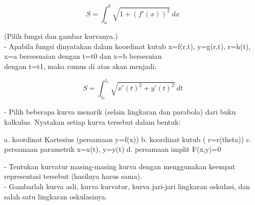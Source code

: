 \documentclass{article}
\begin{document}
\begin{eulernotebook}
\begin{eulercomment}
\begin{eulercomment}
\begin{eulercomment}
\begin{eulercomment}
\begin{eulercomment}
\begin{eulercomment}
\begin{eulercomment}
\begin{eulercomment}
\begin{eulercomment}
\begin{eulercomment}
\begin{eulercomment}
\begin{eulercomment}
\begin{eulercomment}
\begin{eulercomment}
\begin{eulercomment}
\begin{eulercomment}
\begin{eulercomment}
\begin{eulercomment}
\begin{eulercomment}
\begin{eulercomment}
\begin{eulercomment}
\begin{eulercomment}
\begin{eulercomment}
\begin{eulercomment}
\begin{eulercomment}
\end{eulercomment}
\begin{eulerformula}
\[
S = \int_a^b \sqrt{1+(f'(x))^2} \ dx
\]
\end{eulerformula}
\begin{eulercomment}
(Pilih fungsi dan gambar kurvanya.)\\
- Apabila fungsi dinyatakan dalam koordinat kutub x=f(r,t), y=g(r,t),
r=h(t), x=a bersesuaian dengan t=t0 dan x=b bersesuian\\
dengan t=t1, maka rumus di atas akan menjadi:

\end{eulercomment}
\begin{eulerformula}
\[
S=\int_{t_0}^{t_1} \sqrt{x'(t)^2+y'(t)^2}\ dt
\]
\end{eulerformula}
\begin{eulercomment}
- Pilih beberapa kurva menarik (selain lingkaran dan parabola) dari
buku  kalkulus. Nyatakan setiap kurva tersebut dalam bentuk:

\end{eulercomment}
\begin{eulerttcomment}
  a. koordinat Kartesius (persamaan y=f(x))
  b. koordinat kutub ( r=r(theta))
  c. persamaan parametrik x=x(t), y=y(t)
  d. persamaan implit F(x,y)=0
\end{eulerttcomment}
\begin{eulercomment}

- Tentukan kurvatur masing-masing kurva dengan menggunakan keempat
representasi tersebut (hasilnya harus sama).\\
- Gambarlah kurva asli, kurva kurvatur, kurva jari-jari lingkaran
oskulasi, dan salah satu lingkaran oskulasinya.



\end{eulercomment}
\end{eulercomment}
\end{eulercomment}
\end{eulercomment}
\end{eulercomment}
\end{eulercomment}
\end{eulercomment}
\end{eulercomment}
\end{eulercomment}
\end{eulercomment}
\end{eulercomment}
\end{eulercomment}
\end{eulercomment}
\end{eulercomment}
\end{eulercomment}
\end{eulercomment}
\end{eulercomment}
\end{eulercomment}
\end{eulercomment}
\end{eulercomment}
\end{eulercomment}
\end{eulercomment}
\end{eulercomment}
\end{eulercomment}
\end{eulercomment}
\end{eulernotebook}
\end{document}
